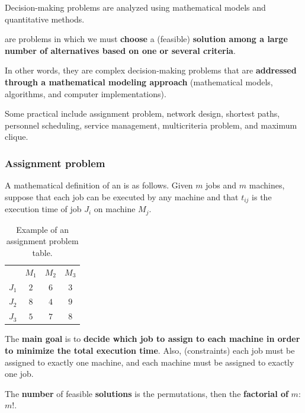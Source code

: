Decision-making problems are analyzed using mathematical models and quantitative methods.

\begin{definitionbox}
     are problems in which we must \textbf{choose} a (feasible) \textbf{solution among a large number of alternatives based on one or several criteria}.
\end{definitionbox}

\highspace
In other words, they are complex decision-making problems that are \textbf{addressed through a mathematical modeling approach} (mathematical models, algorithms, and computer implementations).

\highspace
Some practical  include assignment problem, network design, shortest paths, personnel scheduling, service management, multicriteria problem, and maximum clique.

\longline

\subsubsection{Assignment problem}

A mathematical definition of an  is as follows. Given $m$ jobs and $m$ machines, suppose that each job can be executed by any machine and that $t_{ij}$ is the execution time of job $J_{i}$ on machine $M_{j}$.

\begin{table}[!htp]
    \centering
    \begin{tabular}{@{} c | c c c @{}}
        & $M_{1}$ & $M_{2}$ & $M_{3}$ \\
        \cmidrule{1-4}
        $J_{1}$ & $2$ & $6$ & $3$ \\
        $J_{2}$ & $8$ & $4$ & $9$ \\
        $J_{3}$ & $5$ & $7$ & $8$
    \end{tabular}
    \caption{Example of an assignment problem table.}
\end{table}

\noindent
The \textbf{main goal} is to \textbf{decide which job to assign to each machine in order to minimize the total execution time}. Also, (constraints) each job must be assigned to exactly one machine, and each machine must be assigned to exactly one job.

\highspace
The \textbf{number} of feasible \textbf{solutions} is the permutations, then the \textbf{factorial of} $m$: $m!$.

